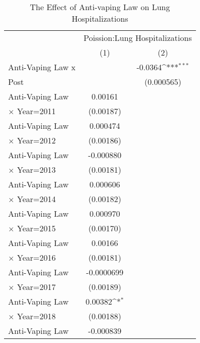 \begin{table}[htbp]\centering
\def\sym#1{\ifmmode^{#1}\else\(^{#1}\)\fi}
\caption{\label{tab:assignment2} The Effect of Anti-vaping Law on Lung Hospitalizations}
\begin{tabular*}{\hsize}{@{\hskip\tabcolsep\extracolsep\fill}l*{2}{c}}
\hline\hline
                    &\multicolumn{2}{c}{Poission:Lung Hospitalizations}\\
                    &\multicolumn{1}{c}{(1)}         &\multicolumn{1}{c}{(2)}         \\
\hline
Anti-Vaping Law x   &                     &     -0.0364\sym{***}\\
Post                &                     &  (0.000565)         \\
[1em]
Anti-Vaping Law       &     0.00161         &                     \\
$\times$ Year=2011  &   (0.00187)         &                     \\
[1em]
Anti-Vaping Law       &    0.000474         &                     \\
$\times$ Year=2012  &   (0.00186)         &                     \\
[1em]
Anti-Vaping Law       &   -0.000880         &                     \\
$\times$ Year=2013  &   (0.00181)         &                     \\
[1em]
Anti-Vaping Law       &    0.000606         &                     \\
$\times$ Year=2014  &   (0.00182)         &                     \\
[1em]
Anti-Vaping Law       &    0.000970         &                     \\
$\times$ Year=2015  &   (0.00170)         &                     \\
[1em]
Anti-Vaping Law       &     0.00166         &                     \\
$\times$ Year=2016  &   (0.00181)         &                     \\
[1em]
Anti-Vaping Law       &  -0.0000699         &                     \\
$\times$ Year=2017  &   (0.00189)         &                     \\
[1em]
Anti-Vaping Law       &     0.00382\sym{*}  &                     \\
$\times$ Year=2018  &   (0.00188)         &                     \\
[1em]
Anti-Vaping Law       &   -0.000839         &                     \\

\end{tabular*}
\end{table}
